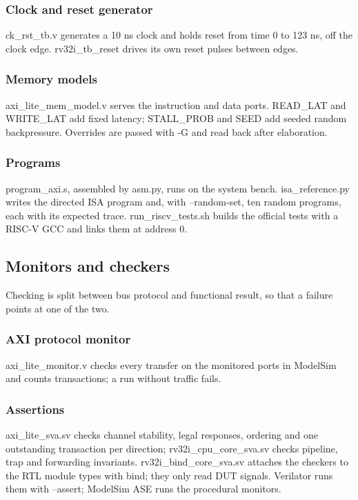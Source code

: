 \documentclass[11pt]{article}
\begin{document}
\subsubsection{Clock and reset generator}
\noindent ck\_rst\_tb.v generates a 10 ns clock and holds reset from time 0 to 123 ns, off the clock edge. rv32i\_tb\_reset drives its own reset pulses between edges.\par\medskip
\subsubsection{Memory models}
\noindent axi\_lite\_mem\_model.v serves the instruction and data ports. READ\_LAT and WRITE\_LAT add fixed latency; STALL\_PROB and SEED add seeded random backpressure. Overrides are passed with -G and read back after elaboration.\par\medskip
\subsubsection{Programs}
\noindent program\_axi.s, assembled by asm.py, runs on the system bench. isa\_reference.py writes the directed ISA program and, with --random-set, ten random programs, each with its expected trace. run\_riscv\_tests.sh builds the official tests with a RISC-V GCC and links them at address 0.\par\medskip

\subsection{Monitors and checkers}
\noindent Checking is split between bus protocol and functional result, so that a failure points at one of the two.\par\medskip
\subsubsection{AXI protocol monitor}
\noindent axi\_lite\_monitor.v checks every transfer on the monitored ports in ModelSim and counts transactions; a run without traffic fails.\par\medskip
\subsubsection{Assertions}
\noindent axi\_lite\_sva.sv checks channel stability, legal responses, ordering and one outstanding transaction per direction; rv32i\_cpu\_core\_sva.sv checks pipeline, trap and forwarding invariants. rv32i\_bind\_core\_sva.sv attaches the checkers to the RTL module types with bind; they only read DUT signals. Verilator runs them with --assert; ModelSim ASE runs the procedural monitors.\par\medskip
\end{document}
